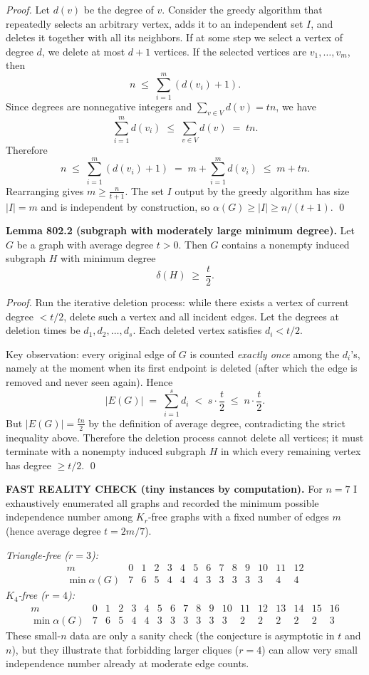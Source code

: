 \emph{Proof.}
Let $d(v)$ be the degree of $v$. Consider the greedy algorithm that repeatedly selects an arbitrary vertex, adds it to an independent set $I$, and deletes it together with all its neighbors. If at some step we select a vertex of degree $d$, we delete at most $d+1$ vertices. If the selected vertices are $v_1,\dots,v_m$, then
\[
 n\;\le\;\sum_{i=1}^m (d(v_i)+1).
\]
Since degrees are nonnegative integers and $\sum_{v\in V} d(v)=tn$, we have
\[
\sum_{i=1}^m d(v_i)\;\le\;\sum_{v\in V} d(v)\;=\;tn.
\]
Therefore
\[
 n\;\le\;\sum_{i=1}^m (d(v_i)+1)\;=\;m+\sum_{i=1}^m d(v_i)\;\le\;m+tn.
\]
Rearranging gives $m\ge \frac{n}{t+1}$. The set $I$ output by the greedy algorithm has size $|I|=m$ and is independent by construction, so $\alpha(G)\ge |I|\ge n/(t+1)$.
\qed

\textbf{Lemma 802.2 (subgraph with moderately large minimum degree).}
Let $G$ be a graph with average degree $t>0$. Then $G$ contains a nonempty induced subgraph $H$ with minimum degree
\[
\delta(H)\;\ge\;\frac{t}{2}.
\]

\emph{Proof.}
Run the iterative deletion process: while there exists a vertex of current degree $<t/2$, delete such a vertex and all incident edges. Let the degrees at deletion times be $d_1,d_2,\dots,d_s$.
Each deleted vertex satisfies $d_i<t/2$.

Key observation: every original edge of $G$ is counted \emph{exactly once} among the $d_i$'s, namely at the moment when its first endpoint is deleted (after which the edge is removed and never seen again). Hence
\[
|E(G)|\;=\;\sum_{i=1}^s d_i\;<\; s\cdot \frac{t}{2}\;\le\; n\cdot \frac{t}{2}.
\]
But $|E(G)|=\frac{tn}{2}$ by the definition of average degree, contradicting the strict inequality above.
Therefore the deletion process cannot delete all vertices; it must terminate with a nonempty induced subgraph $H$ in which every remaining vertex has degree $\ge t/2$.
\qed

\textbf{FAST REALITY CHECK (tiny instances by computation).}
For $n=7$ I exhaustively enumerated all graphs and recorded the minimum possible independence number among $K_r$-free graphs with a fixed number of edges $m$ (hence average degree $t=2m/7$).

\emph{Triangle-free ($r=3$):}
\[
\begin{array}{c|ccccccccccccc}
 m &0&1&2&3&4&5&6&7&8&9&10&11&12\\\hline
 \min\alpha(G) &7&6&5&4&4&4&3&3&3&3&3&4&4
\end{array}
\]
\emph{$K_4$-free ($r=4$):}
\[
\begin{array}{c|ccccccccccccccccc}
 m &0&1&2&3&4&5&6&7&8&9&10&11&12&13&14&15&16\\\hline
 \min\alpha(G) &7&6&5&4&4&3&3&3&3&3&3&2&2&2&2&2&3
\end{array}
\]
These small-$n$ data are only a sanity check (the conjecture is asymptotic in $t$ and $n$), but they illustrate that forbidding larger cliques ($r=4$) can allow very small independence number already at moderate edge counts.


